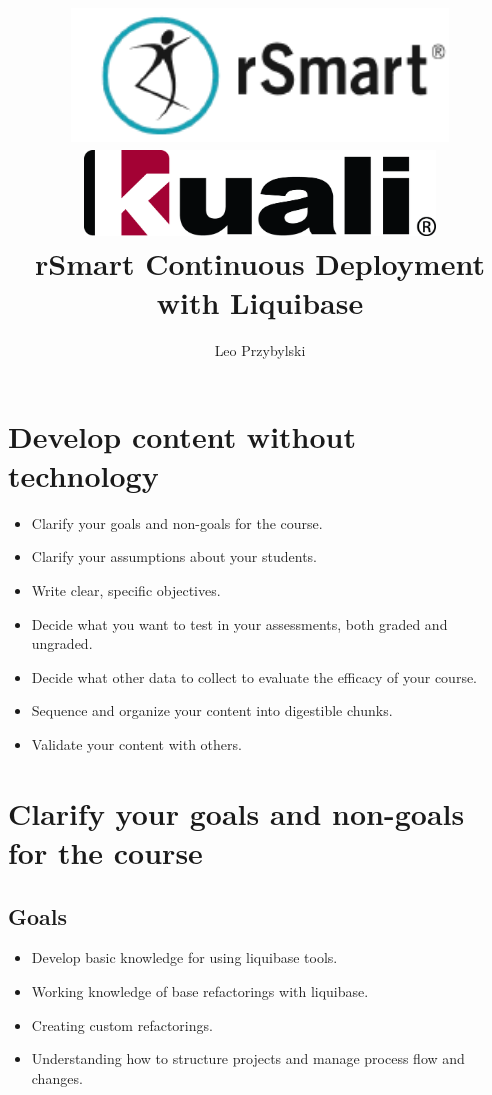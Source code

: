 \documentclass[12pt,notitlepage]{article}
\author{Leo Przybylski}
\title{\includegraphics[width=0.75\textwidth]{./images/rsmart_base.png}\\\includegraphics[width=0.70\textwidth]{./images/kuali_base.png}\\rSmart
Continuous Deployment with Liquibase}
\begin{document}
\maketitle
\tableofcontents


\section{Develop content without technology}

\begin{itemize}
\item Clarify your goals and non-goals for the course.
\item Clarify your assumptions about your students.
\item Write clear, specific objectives.
\item Decide what you want to test in your assessments, both graded and ungraded.
\item Decide what other data to collect to evaluate the efficacy of your course.
\item Sequence and organize your content into digestible chunks.
\item Validate your content with others.
\end{itemize}

\section{Clarify your goals and non-goals for the course}

\subsection{Goals}

\begin{itemize}
\item Develop basic knowledge for using liquibase tools.
\item Working knowledge of base refactorings with liquibase.
\item Creating custom refactorings.
\item Understanding how to structure projects and manage process flow and changes.
\end{itemize}
\end{document}
